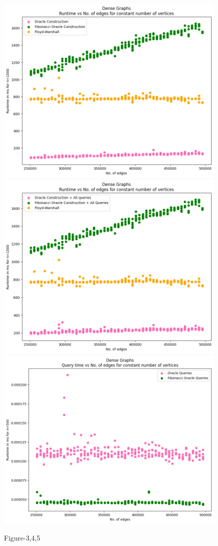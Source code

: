 \documentclass[12pt, a4paper]{article}
\begin{document}
    \begin{figure}[H]
    \caption*{Figure-3,4,5}
     
    \includegraphics[scale=0.4]{./images/4}
    \includegraphics[scale=0.4]{./images/5}
     \includegraphics[scale=0.5]{./images/6}
     \centering
    \end{figure} 
\end{document}
